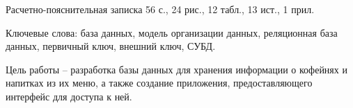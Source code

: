 
Расчетно-пояснительная записка 56 с., 24 рис., 12 табл., 13 ист., 1 прил.

Ключевые слова: база данных, модель организации данных, реляционная база данных, первичный ключ, внешний ключ, СУБД.

Цель работы -- разработка базы данных для хранения информации о кофейнях и напитках из их меню, а также создание приложения, предоставляющего интерфейс для доступа к ней.